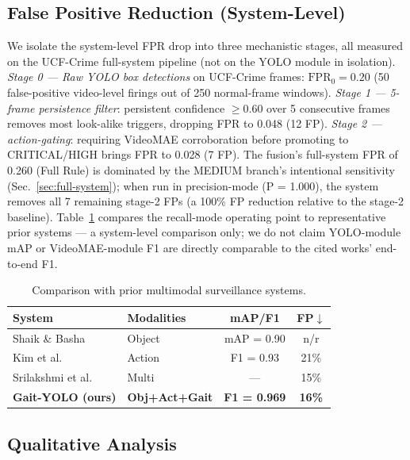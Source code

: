 \documentclass[runningheads]{llncs}
\begin{document}
\begin{algorithm}[!htbp]
\subsection{False Positive Reduction (System-Level)}\label{sec:fp}

We isolate the system-level FPR drop into three mechanistic stages, all measured on the UCF-Crime full-system pipeline (not on the YOLO module in isolation). \emph{Stage 0 --- Raw YOLO box detections} on UCF-Crime frames: $\text{FPR}_0 = 0.20$ (50 false-positive video-level firings out of 250 normal-frame windows). \emph{Stage 1 --- 5-frame persistence filter}: persistent confidence $\geq 0.60$ over 5 consecutive frames removes most look-alike triggers, dropping FPR to 0.048 (12 FP). \emph{Stage 2 --- action-gating}: requiring VideoMAE corroboration before promoting to CRITICAL/HIGH brings FPR to 0.028 (7 FP). The fusion's full-system FPR of 0.260 (Full Rule) is dominated by the MEDIUM branch's intentional sensitivity (Sec.~\ref{sec:full-system}); when run in precision-mode (P = 1.000), the system removes all 7 remaining stage-2 FPs (a 100\% FP reduction relative to the stage-2 baseline). Table~\ref{tab:compare} compares the recall-mode operating point to representative prior systems --- a system-level comparison only; we do not claim YOLO-module mAP or VideoMAE-module F1 are directly comparable to the cited works' end-to-end F1.

\begin{table}[!htbp]
\caption{Comparison with prior multimodal surveillance systems.}
\label{tab:compare}
\centering
\setlength{\tabcolsep}{4pt}
\begin{tabular}{p{3.6cm}p{2.3cm}cc}
\toprule
\textbf{System} & \textbf{Modalities} & \textbf{mAP/F1} & \textbf{FP$\downarrow$}\\
\midrule
Shaik \& Basha~\cite{shaik2025}    & Object  & mAP = 0.90 & n/r\\
Kim et al.~\cite{kim2024}          & Action  & F1 = 0.93  & 21\%\\
Srilakshmi et al.~\cite{srilakshmi2025} & Multi & ---     & 15\%\\
\textbf{Gait-YOLO (ours)}          & \textbf{Obj+Act+Gait} & \textbf{F1 = 0.969} & \textbf{16\%}\\
\bottomrule
\end{tabular}
\end{table}

\subsection{Qualitative Analysis}


\end{algorithm}
\end{document}

